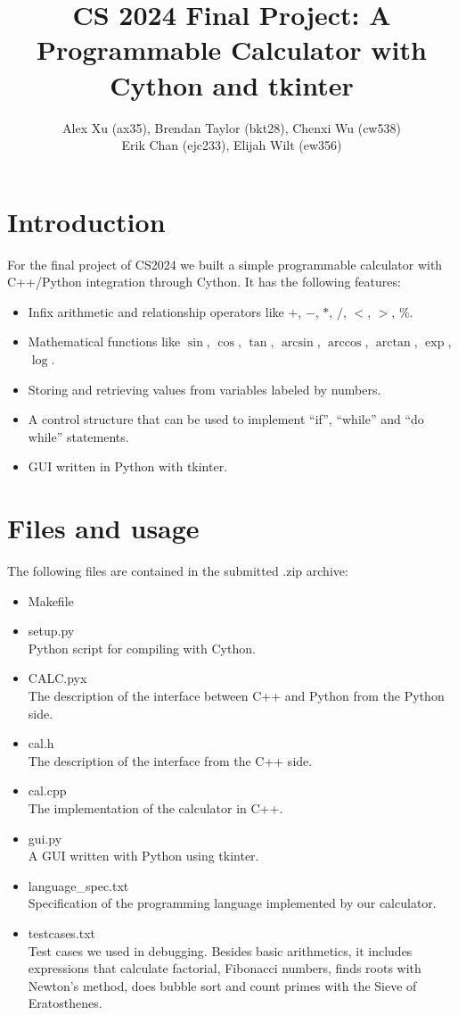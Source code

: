 \documentclass[]{article}
\title{CS 2024 Final Project: A Programmable Calculator with Cython and tkinter}
\author{Alex Xu (ax35), Brendan Taylor (bkt28), Chenxi Wu (cw538)\\ Erik Chan (ejc233), Elijah Wilt (ew356)}
\begin{document}
\maketitle

\section{Introduction}

For the final project of CS2024 we built a simple programmable calculator with C++/Python integration through Cython. It has the following features:
\begin{itemize}
	\item Infix arithmetic and relationship operators like $+$, $-$, $*$, $/$, $<$, $>$, $\%$.
	\item Mathematical functions like $\sin$, $\cos$, $\tan$, $\arcsin$, $\arccos$, $\arctan$, $\exp$, $\log$.
	\item Storing and retrieving values from variables labeled by numbers.
	\item A control structure that can be used to implement ``if'', ``while'' and ``do while'' statements.
	\item GUI written in Python with tkinter.
\end{itemize}

\section{Files and usage}

The following files are contained in the submitted .zip archive:
\begin{itemize}
	\item Makefile
	\item setup.py\\
	Python script for compiling with Cython.
	\item CALC.pyx\\
	The description of the interface between C++ and Python from the Python side.
	\item cal.h\\
	The description of the interface from the C++ side.
	\item cal.cpp\\
	The implementation of the calculator in C++.
	\item gui.py\\
	A GUI written with Python using tkinter.
	\item language\_spec.txt\\
	Specification of the programming language implemented by our calculator.
	\item testcases.txt\\
	Test cases we used in debugging. Besides basic arithmetics, it includes expressions that calculate factorial, Fibonacci numbers, finds roots with Newton's method, does bubble sort and count primes with the Sieve of Eratosthenes. 
\end{itemize}
\end{document}
